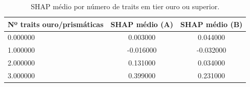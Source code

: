 \begin{table}[htbp]
\caption{SHAP médio por número de traits em tier ouro ou superior.}
\label{tab:h1mono}
\centering
\small
\begin{tabular}{lcc}
\toprule
Nº traits ouro/prismáticas & SHAP médio (A) & SHAP médio (B) \\
\midrule
0.000000 & 0.003000 & 0.044000 \\
1.000000 & -0.016000 & -0.032000 \\
2.000000 & 0.131000 & 0.034000 \\
3.000000 & 0.399000 & 0.231000 \\
\bottomrule
\end{tabular}
\end{table}

